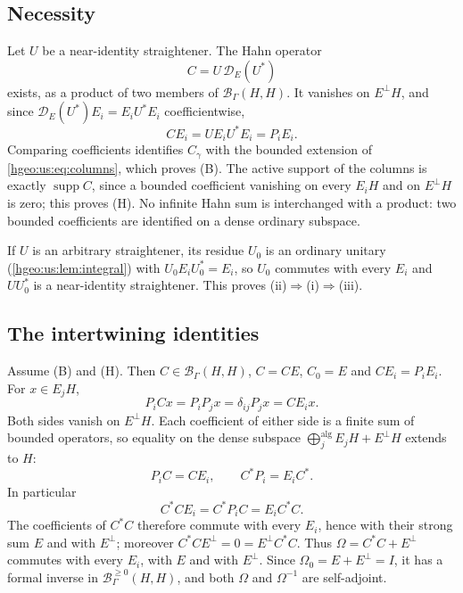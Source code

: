 \documentclass[11pt,letterpaper]{article}
\numberwithin{equation}{section}
\theoremstyle{definition}
\theoremstyle{remark}
\newcommand{\BH}{\mathscr B_\Gamma(H,H)}
\newcommand{\supp}{\operatorname{supp}}
\newcommand{\Bnn}{\mathscr B^{\ge0}_\Gamma(H,H)}
\newcommand{\Dg}{\mathscr D}
\begin{document}
\subsection{Necessity}
Let $U$ be a near-identity straightener. The Hahn operator
\begin{equation}\label{hgeo:us:eq:necessity}
 C=U\,\Dg_E(U^*)
\end{equation}
exists, as a product of two members of $\BH$. It vanishes on $E^\perp H$, and
since $\Dg_E(U^*)E_i=E_iU^*E_i$ coefficientwise,
\[
 CE_i=UE_iU^*E_i=P_iE_i .
\]
Comparing coefficients identifies $C_\gamma$ with the bounded extension of
\eqref{hgeo:us:eq:columns}, which proves (B). The active support of the
columns is exactly $\supp C$, since a bounded coefficient vanishing on every
$E_iH$ and on $E^\perp H$ is zero; this proves (H). No infinite Hahn sum is
interchanged with a product: two bounded coefficients are identified on a
dense ordinary subspace.

If $U$ is an arbitrary straightener, its residue $U_0$ is an ordinary unitary
(\cref{hgeo:us:lem:integral}) with $U_0E_iU_0^*=E_i$, so $U_0$ commutes with
every $E_i$ and $UU_0^*$ is a near-identity straightener. This proves
(ii)$\Rightarrow$(i)$\Rightarrow$(iii).

\subsection{The intertwining identities}
Assume (B) and (H). Then $C\in\BH$, $C=CE$, $C_0=E$ and $CE_i=P_iE_i$. For
$x\in E_jH$,
\[
 P_iCx=P_iP_jx=\delta_{ij}P_jx=CE_ix .
\]
Both sides vanish on $E^\perp H$. Each coefficient of either side is a finite
sum of bounded operators, so equality on the dense subspace
$\bigoplus_j^{\mathrm{alg}}E_jH+E^\perp H$ extends to $H$:
\begin{equation}\label{hgeo:us:eq:intertwine}
 P_iC=CE_i,\qquad C^*P_i=E_iC^* .
\end{equation}
In particular
\begin{equation}\label{hgeo:us:eq:commute}
 C^*CE_i=C^*P_iC=E_iC^*C .
\end{equation}
The coefficients of $C^*C$ therefore commute with every $E_i$, hence with
their strong sum $E$ and with $E^\perp$; moreover $C^*CE^\perp=0=E^\perp C^*C$.
Thus $\Omega=C^*C+E^\perp$ commutes with every $E_i$, with $E$ and with
$E^\perp$. Since $\Omega_0=E+E^\perp=I$, it has a formal inverse in $\Bnn$,
and both $\Omega$ and $\Omega^{-1}$ are self-adjoint.
\end{document}
